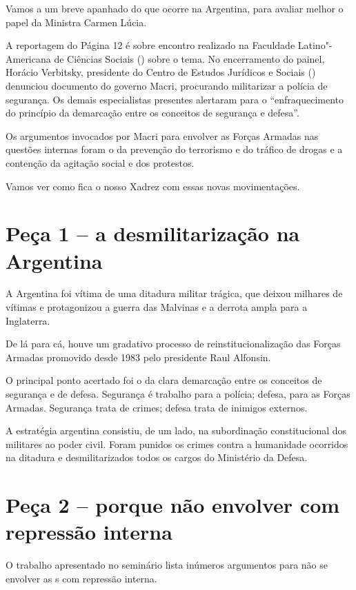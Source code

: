  

Vamos a um breve apanhado do que ocorre na Argentina, para avaliar
melhor o papel da Ministra Carmen Lúcia.

A reportagem do Página 12 é sobre encontro realizado na Faculdade
Latino"-Americana de Ciências Sociais () sobre o tema. No
encerramento do painel, Horácio Verbitsky, presidente do Centro de
Estudos Jurídicos e Sociais ()~ denunciou documento do governo
Macri, procurando militarizar a polícia de segurança. Os demais
especialistas presentes alertaram para o ``enfraquecimento do princípio
da demarcação entre os conceitos de segurança e defesa''.

Os argumentos invocados por Macri para envolver as Forças Armadas nas
questões internas foram o da prevenção do terrorismo e do tráfico de
drogas e a contenção da agitação social e dos protestos.

Vamos ver como fica o nosso Xadrez com essas novas movimentações.

\section{Peça 1 -- a desmilitarização na Argentina}

A Argentina foi vítima de uma ditadura militar trágica, que deixou
milhares de vítimas e protagonizou a guerra das Malvinas e a derrota
ampla para a Inglaterra.

De lá para cá, houve um gradativo processo de reinstitucionalização das
Forças Armadas promovido desde 1983 pelo presidente Raul Alfonsin.

O principal ponto acertado foi o da clara demarcação entre os conceitos
de segurança e de defesa. Segurança é trabalho para a polícia; defesa,
para as Forças Armadas. Segurança trata de crimes; defesa trata de
inimigos externos.

A estratégia argentina consistiu, de um lado, na subordinação
constitucional dos militares ao poder civil. Foram punidos os crimes
contra a humanidade ocorridos na ditadura e desmilitarizados todos os
cargos do Ministério da Defesa.

\section{Peça 2 -- porque não envolver  com repressão interna}

O trabalho apresentado no seminário lista inúmeros argumentos para não
se envolver as s com repressão interna.

